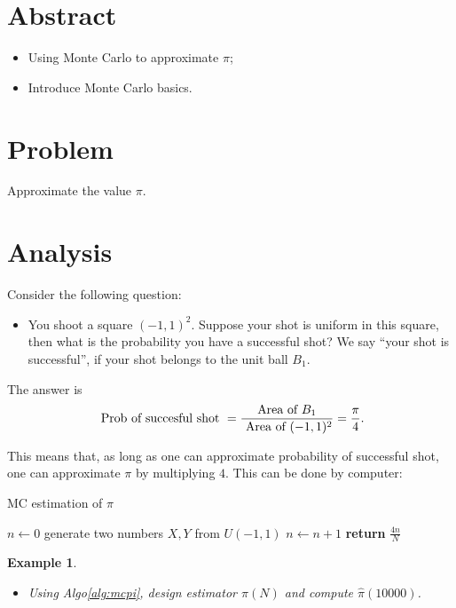 \documentclass{article}
\newtheorem{example}{Example}
\begin{document}
\section{Abstract}
\begin{itemize}
 \item Using Monte Carlo to approximate $\pi$;
 \item Introduce Monte Carlo basics.
\end{itemize}

\section{Problem}
Approximate the value $\pi$.

\section{Analysis}
Consider the following question:

\begin{itemize}
 \item You shoot a square $(-1, 1)^{2}$. Suppose your shot is uniform in this square, then what is the probability you have a successful shot? We say
 ``your shot is successful'', if your shot belongs to the unit ball $B_{1}$.
\end{itemize}

The answer is 
$$\hbox{ Prob of succesful shot } = \frac{\hbox{Area of  }B_{1}} { \hbox{ Area of }(-1, 1)^{2}} = \frac{\pi}{4} .$$


This means that, as long as one can approximate probability of successful shot, one can approximate $\pi$ by multiplying $4$. This can be done by computer: 


\begin{algorithm}
\caption{MC estimation of $\pi$}\label{alg:mcpi}
\begin{algorithmic}[1]
\State  $n \gets 0$ 
	\State generate two numbers $X, Y$ from $U(-1,1)$
		$n \gets n+1$
	\EndIf
\EndFor
\State \textbf{return} $\frac{4n}{N}$
\EndProcedure
\end{algorithmic}
\end{algorithm}

\begin{example}\label{exm:mcpi}
\begin{itemize}
 \item Using Algo\ref{alg:mcpi}, design estimator $\hat \pi(N)$ and 
 compute $\hat \pi(10000)$.
\end{itemize}

\end{example}
\end{document}
